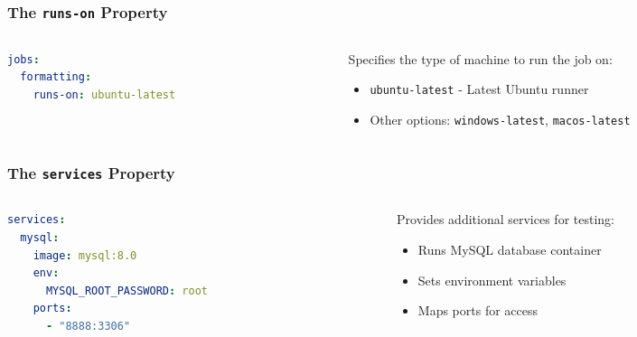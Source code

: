 \begin{frame}[fragile]
	\frametitle{The \texttt{runs-on} Property}
	\begin{columns}
		\begin{column}{0.5\textwidth}
			\begin{lstlisting}[language=yaml,basicstyle=\small\ttfamily]
jobs:
  formatting:
    runs-on: ubuntu-latest
			\end{lstlisting}
		\end{column}
		\begin{column}{0.5\textwidth}
			Specifies the type of machine to run the job on:
			\begin{itemize}
				\item \texttt{ubuntu-latest} - Latest Ubuntu runner
				\item Other options: \texttt{windows-latest}, \texttt{macos-latest}
			\end{itemize}
		\end{column}
	\end{columns}
\end{frame}

\begin{frame}[fragile]
	\frametitle{The \texttt{services} Property}
	\begin{columns}
		\begin{column}{0.5\textwidth}
			\begin{lstlisting}[language=yaml,basicstyle=\small\ttfamily]
services:
  mysql:
    image: mysql:8.0
    env:
      MYSQL_ROOT_PASSWORD: root
    ports:
      - "8888:3306"
			\end{lstlisting}
		\end{column}
		\begin{column}{0.5\textwidth}
			Provides additional services for testing:
			\begin{itemize}
				\item Runs MySQL database container
				\item Sets environment variables
				\item Maps ports for access
			\end{itemize}
		\end{column}
	\end{columns}
\end{frame}

